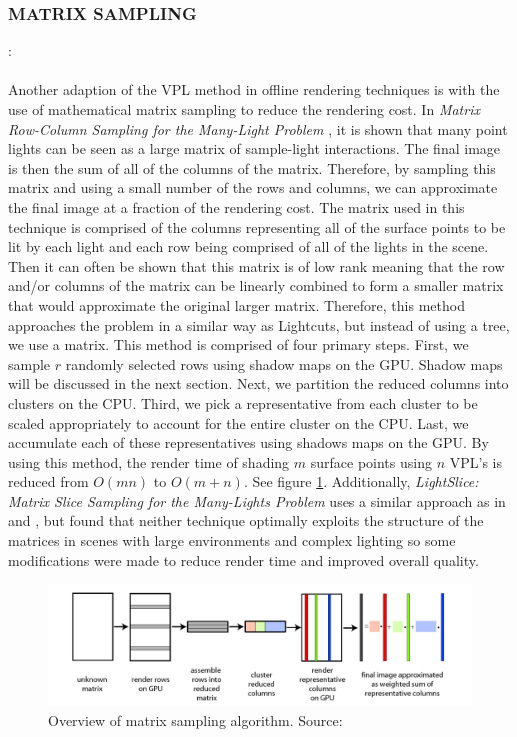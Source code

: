 \subsubsection{MATRIX SAMPLING}: 
\paragraph{}
Another adaption of the VPL method in offline rendering techniques is with the use of mathematical matrix sampling to reduce the rendering cost.  In \textit{Matrix Row-Column Sampling for the Many-Light Problem} \cite{Havsan2007}, it is shown that many point lights can be seen as a large matrix of sample-light interactions.  The final image is then the sum of all of the columns of the matrix.  Therefore, by sampling this matrix and using a small number of the rows and columns, we can approximate the final image at a fraction of the rendering cost.  The matrix used in this technique is comprised of the columns representing all of the surface points to be lit by each light and each row being comprised of all of the lights in the scene.  Then it can often be shown that this matrix is of low rank meaning that the row and/or columns of the matrix can be linearly combined to form a smaller matrix that would approximate the original larger matrix.  Therefore, this method approaches the problem in a similar way as Lightcuts, but instead of using a tree, we use a matrix.  This method is comprised of four primary steps.  First, we sample $r$ randomly selected rows using shadow maps on the GPU.  Shadow maps will be discussed in the next section.  Next, we partition the reduced columns into clusters on the CPU.  Third, we pick a representative from each cluster to be scaled appropriately to account for the entire cluster on the CPU.  Last, we accumulate each of these representatives using shadows maps on the GPU.  By using this method, the render time of shading $m$ surface points using $n$ VPL's is reduced from $O(mn)$ to $O(m+n)$.  See figure \ref{fig:matrixSampling}.  Additionally, \textit{LightSlice: Matrix Slice Sampling for the Many-Lights Problem} \cite{Ou2011} uses a similar approach as in \cite{Havsan2007} and \cite{Walter2005}, but found that neither technique optimally exploits the structure of the matrices in scenes with large environments and complex lighting so some modifications were made to reduce render time and improved overall quality.

\begin{figure}[h!]
  \centering
    \includegraphics[width=1.0\textwidth]{matrixSampling.jpg}
  \caption{Overview of matrix sampling algorithm. Source: \protect\cite{Havsan2007}}
	\label{fig:matrixSampling}
\end{figure}

